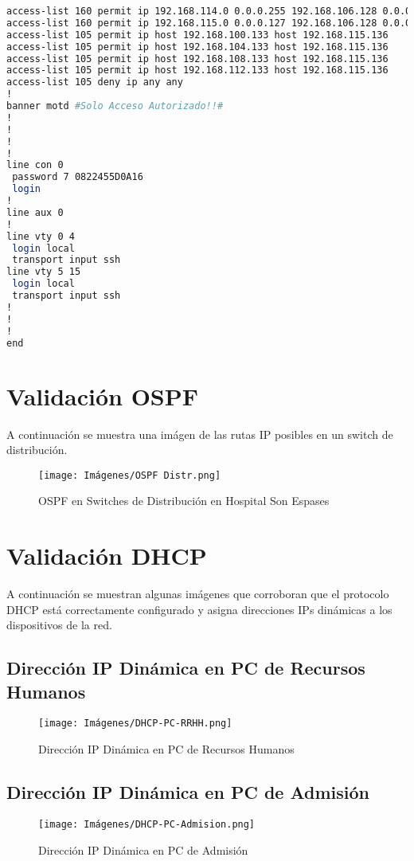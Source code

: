 \begin{lstlisting}[language=Bash, caption={Configuración Completa Router Son Llàtzer}]
access-list 160 permit ip 192.168.114.0 0.0.0.255 192.168.106.128 0.0.0.63
access-list 160 permit ip 192.168.115.0 0.0.0.127 192.168.106.128 0.0.0.63
access-list 105 permit ip host 192.168.100.133 host 192.168.115.136
access-list 105 permit ip host 192.168.104.133 host 192.168.115.136
access-list 105 permit ip host 192.168.108.133 host 192.168.115.136
access-list 105 permit ip host 192.168.112.133 host 192.168.115.136
access-list 105 deny ip any any
!
banner motd #Solo Acceso Autorizado!!#
!
!
!
!
line con 0
 password 7 0822455D0A16
 login
!
line aux 0
!
line vty 0 4
 login local
 transport input ssh
line vty 5 15
 login local
 transport input ssh
!
!
!
end


\end{lstlisting}


\section{Validación OSPF}\label{anexo:Pruebaospf}
A continuación se muestra una imágen de las rutas IP posibles en un switch de distribución.
\begin{figure}[H]
    \centering
    \texttt{[image: Imágenes/OSPF Distr.png]}
    \caption{OSPF en Switches de Distribución en Hospital Son Espases}
\end{figure}

\section{Validación DHCP}\label{anexo:Pruebadhcp}
A continuación se muestran algunas imágenes que corroboran que el protocolo DHCP está correctamente configurado y asigna direcciones IPs dinámicas a los dispositivos de la red.
\subsection{Dirección IP Dinámica en PC de Recursos Humanos}
\begin{figure}[H]
    \centering
    \texttt{[image: Imágenes/DHCP-PC-RRHH.png]}
    \caption{Dirección IP Dinámica en PC de Recursos Humanos}
\end{figure}
\subsection{Dirección IP Dinámica en PC de Admisión}
\begin{figure}[H]
    \centering
    \texttt{[image: Imágenes/DHCP-PC-Admision.png]}
    \caption{Dirección IP Dinámica en PC de Admisión}
\end{figure}

